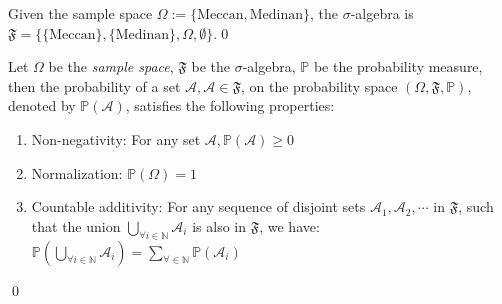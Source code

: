 \begin{exmpx}
Given the sample space $\Omega:=\{\text{Meccan},\text{Medinan}\}$, the $\sigma$-algebra is $\mathfrak{F}=\{\{\text{Meccan}\},\{\text{Medinan}\},\Omega,\emptyset\}$.\qed
\end{exmpx}
\begin{defnx}\label{defn:probability_measure}
Let $\Omega$ be the \textit{sample space}, $\mathfrak{F}$ be the $\sigma$-algebra, $\mathbb{P}$ be the probability measure, then the probability of a set $\mathscr{A}, \mathscr{A}\in\mathfrak{F}$, on the probability space $(\Omega,\mathfrak{F},\mathbb{P})$, denoted by $\mathbb{P}(\mathscr{A})$, satisfies the following properties:
\begin{enumerate}
    \item Non-negativity: For any set $\mathscr{A}, \mathbb{P}(\mathscr{A})\geq 0$
    \item Normalization: $\mathbb{P}(\Omega)=1$
    \item Countable additivity: For any sequence of disjoint sets $\mathscr{A}_1,\mathscr{A}_2,\cdots$ in $\mathfrak{F}$, such that the union $\bigcup_{\forall i \in\mathbb{N}}\mathscr{A}_i$ is also in $\mathfrak{F}$, we have: $\mathbb{P}\left(\displaystyle\bigcup_{\forall i\in\mathbb{N}}\mathscr{A}_i\right)=\displaystyle\sum_{\forall \in\mathbb{N}}\mathbb{P}(\mathscr{A}_i)$
\end{enumerate}
\qed
\end{defnx}

